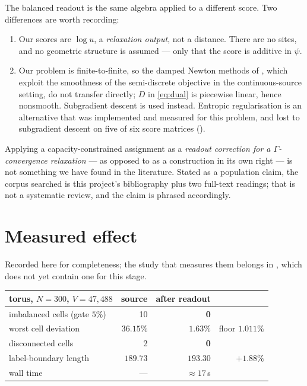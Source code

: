 \documentclass[11pt,a4paper]{article}
\begin{document}
The balanced readout is the same algebra applied to a different score. Two
differences are worth recording:
\begin{enumerate}\itemsep2pt
  \item Our scores are $\log u$, a \emph{relaxation output}, not a distance. There
    are no sites, and no geometric structure is assumed --- only that the score is
    additive in $\psi$.
  \item Our problem is finite-to-finite, so the damped Newton methods of
    \cite{kitagawa2019convergence}, which exploit the smoothness of the
    semi-discrete objective in the continuous-source setting, do not transfer
    directly; $D$ in \eqref{eq:dual} is piecewise linear, hence nonsmooth.
    Subgradient descent is used instead. Entropic regularisation
    \cite{cuturi2013sinkhorn} is an alternative that was implemented and measured
    for this problem, and lost to subgradient descent on five of six score
    matrices ().
\end{enumerate}

\begin{remark}
Applying a capacity-constrained assignment as a \emph{readout correction for a
$\Gamma$-convergence relaxation} --- as opposed to as a construction in its own
right --- is not something we have found in the literature. Stated as a population
claim, the corpus searched is this project's bibliography plus two full-text
readings; that is not a systematic review, and the claim is phrased accordingly.
\end{remark}

\section{Measured effect}
\label{sec:measured}

Recorded here for completeness; the study that measures them belongs in
, which does not yet contain one for this stage.

\begin{center}\small
\begin{tabular}{@{}lrrr@{}}
\toprule
torus, $N=300$, $V=47{,}488$ & source & after readout & \\
\midrule
imbalanced cells (gate $5\%$) & 10 & \textbf{0} & \\
worst cell deviation & $36.15\%$ & $\mathbf{1.63\%}$ & floor $1.011\%$ \\
disconnected cells & 2 & \textbf{0} & \\
label-boundary length & $189.73$ & $193.30$ & $+1.88\%$ \\
wall time & --- & $\approx 17$\,s & \\
\bottomrule
\end{tabular}
\end{center}
\end{document}
